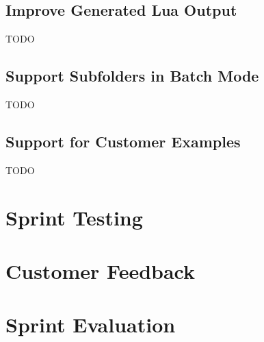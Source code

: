 \subsection{Improve Generated Lua Output}
TODO

\subsection{Support Subfolders in Batch Mode}
TODO

\subsection{Support for Customer Examples}
TODO

\section{Sprint Testing}


\section{Customer Feedback}


\section{Sprint Evaluation}


